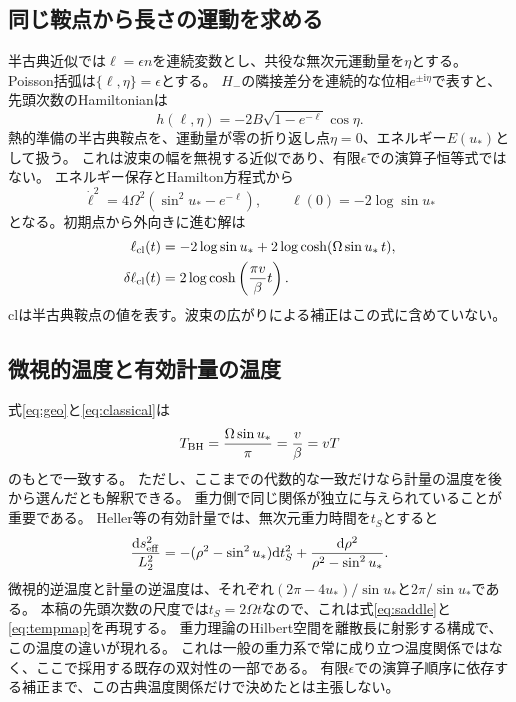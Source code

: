 \documentclass[a4paper,11pt]{ltjsarticle}
\numberwithin{equation}{section}
\newcommand{\dd}{\mathrm d}
\newcommand{\ii}{\mathrm i}
\begin{document}
\subsection{同じ鞍点から長さの運動を求める}
半古典近似では$\ell=\epsilon n$を連続変数とし、共役な無次元運動量を$\eta$とする。
Poisson括弧は$\{\ell,\eta\}=\epsilon$とする。
$H_-$の隣接差分を連続的な位相$e^{\pm\ii\eta}$で表すと、先頭次数のHamiltonianは
\begin{equation}
 h(\ell,\eta)=-2B\sqrt{1-e^{-\ell}}\cos\eta.
\end{equation}
熱的準備の半古典鞍点を、運動量が零の折り返し点$\eta=0$、エネルギー$E(u_*)$として扱う。
これは波束の幅を無視する近似であり、有限$\epsilon$での演算子恒等式ではない。
エネルギー保存とHamilton方程式から
\begin{equation}
 \dot\ell^2=4\Omega^2(\sin^2u_*-e^{-\ell}),\qquad
 \ell(0)=-2\log\sin u_*
\end{equation}
となる。初期点から外向きに進む解は
\begin{align}
 \ell_{\rm cl}(t)&=-2\log\sin u_*+
             2\log\cosh(\Omega\sin u_*\,t),\\
 \delta\ell_{\rm cl}(t)&=2\log\cosh\left(\frac{\pi v}{\beta}t\right).
 \label{eq:classical}
\end{align}
$\mathrm{cl}$は半古典鞍点の値を表す。波束の広がりによる補正はこの式に含めていない。

\subsection{微視的温度と有効計量の温度}
式\eqref{eq:geo}と\eqref{eq:classical}は
\begin{equation}
 T_{\rm BH}=\frac{\Omega\sin u_*}{\pi}=\frac{v}{\beta}=vT
 \label{eq:tempmap}
\end{equation}
のもとで一致する。
ただし、ここまでの代数的な一致だけなら計量の温度を後から選んだとも解釈できる。
重力側で同じ関係が独立に与えられていることが重要である。
Heller等の有効計量\cite{Heller}では、無次元重力時間を$t_S$とすると
\begin{equation}
 \frac{\dd s^2_{\rm eff}}{L_2^2}
 =-(\rho^2-\sin^2u_*)\dd t_S^2
   +\frac{\dd\rho^2}{\rho^2-\sin^2u_*}.
\end{equation}
微視的逆温度と計量の逆温度は、それぞれ$(2\pi-4u_*)/\sin u_*$と$2\pi/\sin u_*$である。
本稿の先頭次数の尺度では$t_S=2\Omega t$なので、これは式\eqref{eq:saddle}と\eqref{eq:tempmap}を再現する。
重力理論のHilbert空間を離散長に射影する構成で、この温度の違いが現れる。
これは一般の重力系で常に成り立つ温度関係ではなく、ここで採用する既存の双対性の一部である。
有限$\epsilon$での演算子順序に依存する補正まで、この古典温度関係だけで決めたとは主張しない。
\end{document}
